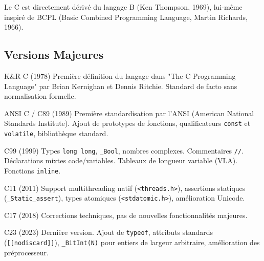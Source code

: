 \documentclass[11pt,a4paper]{article}
\begin{document}
Le C est directement dérivé du langage B (Ken Thompson, 1969), lui-même inspiré de BCPL (Basic Combined Programming Language, Martin Richards, 1966).

\subsection{Versions Majeures}

\begin{definitionbox}{K\&R C (1978)}
Première définition du langage dans "The C Programming Language" par Brian Kernighan et Dennis Ritchie. Standard de facto sans normalisation formelle.
\end{definitionbox}

\begin{definitionbox}{ANSI C / C89 (1989)}
Première standardisation par l'ANSI (American National Standards Institute). Ajout de prototypes de fonctions, qualificateurs \texttt{const} et \texttt{volatile}, bibliothèque standard.
\end{definitionbox}

\begin{definitionbox}{C99 (1999)}
Types \texttt{long long}, \texttt{\_Bool}, nombres complexes. Commentaires \texttt{//}. Déclarations mixtes code/variables. Tableaux de longueur variable (VLA). Fonctions \texttt{inline}.
\end{definitionbox}

\begin{definitionbox}{C11 (2011)}
Support multithreading natif (\texttt{<threads.h>}), assertions statiques (\texttt{\_Static\_assert}), types atomiques (\texttt{<stdatomic.h>}), amélioration Unicode.
\end{definitionbox}

\begin{definitionbox}{C17 (2018)}
Corrections techniques, pas de nouvelles fonctionnalités majeures.
\end{definitionbox}

\begin{definitionbox}{C23 (2023)}
Dernière version. Ajout de \texttt{typeof}, attributs standards (\texttt{[[nodiscard]]}), \texttt{\_BitInt(N)} pour entiers de largeur arbitraire, amélioration des préprocesseur.
\end{definitionbox}
\end{document}
